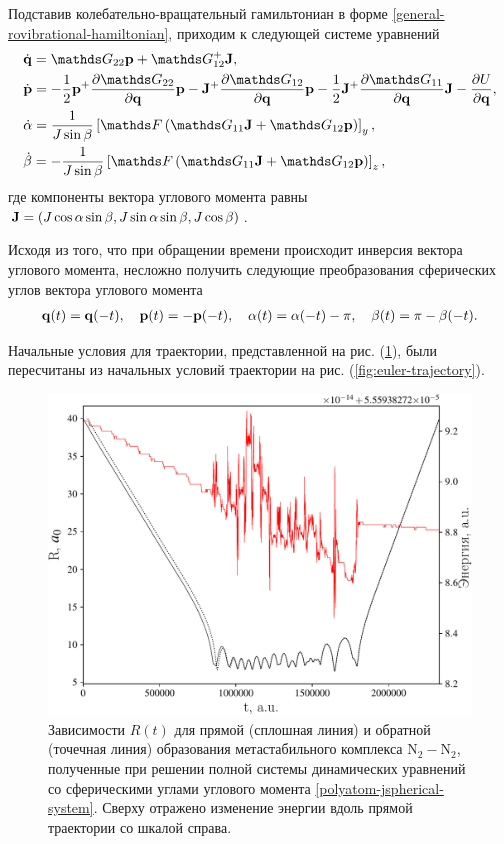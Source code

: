 Подставив колебательно-вращательный гамильтониан в форме \eqref{general-rovibrational-hamiltonian}, приходим к следующей системе уравнений
\begin{gather}
    \begin{aligned}
        &\dot{\mf{q}} = \bbG_{22} \mf{p} + \bbG_{12}^+ \mf{J}, \\
        &\dot{\mf{p}} = -\frac{1}{2} \mf{p}^+ \frac{\partial \bbG_{22}}{\partial \mf{q}} \mf{p} - \mf{J}^+ \frac{\partial \bbG_{12}}{\partial \mf{q}} \mf{p} - \frac{1}{2} \mf{J}^+ \frac{\partial \bbG_{11}}{\partial \mf{q}} \mf{J} - \frac{\partial U}{\partial \mf{q}}, \\
        &\dot{\alpha} = \frac{1}{J \sin \beta} \lsq \bbF \lb \bbG_{11} \mf{J} + \bbG_{12} \mf{p} \rb \rsq_y, \\
        &\dot{\beta} = -\frac{1}{J \sin \beta} \lsq \bbF \lb \bbG_{11} \mf{J} + \bbG_{12} \mf{p} \rb \rsq_z, 
    \end{aligned} \label{polyatom-jspherical-system}
\end{gather}
%
где компоненты вектора углового момента равны $\mathbf{J} = \left( J \cos \alpha \sin \beta, J \sin \alpha \sin \beta, J \cos \beta \right)$. \par
Исходя из того, что при обращении времени происходит инверсия вектора углового момента, несложно получить следующие преобразования сферических углов вектора углового момента
\begin{gather}
    \mathbf{q}(t) = \mathbf{q}(-t), \quad \mathbf{p}(t) = -\mathbf{p}(-t), \quad \alpha(t) = \alpha(-t) - \pi, \quad \beta(t) = \pi - \beta(-t).
\end{gather}

Начальные условия для траектории, представленной на рис. (\ref{fig:jspherical-trajectory}), были пересчитаны из начальных условий траектории на рис. (\ref{fig:euler-trajectory}). 

\begin{figure}[H]
    \centering
    \includegraphics[width=0.75\linewidth]{./pictures/trajectories/spherical_trajectory-crop.pdf}
    \caption{Зависимости $R(t)$ для прямой (сплошная линия) и обратной (точечная линия) образования метастабильного комплекса N$_2-$N$_2$, полученные при решении полной системы динамических уравнений со сферическими углами углового момента \eqref{polyatom-jspherical-system}. Сверху отражено изменение энергии вдоль прямой траектории со шкалой справа.}
    \label{fig:jspherical-trajectory}
\end{figure}

